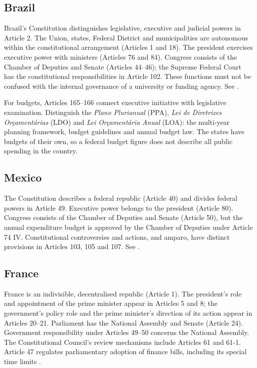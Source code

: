 \subsection{Brazil}
\label{section-gsf-brazil-state}

Brazil's Constitution distinguishes
legislative,
executive and judicial powers in Article 2.
The Union, states, Federal District and
municipalities
are autonomous within the constitutional
arrangement
(Articles 1 and 18).
The president exercises executive power with
ministers
(Articles 76 and 84).
Congress consists of the Chamber of Deputies
and Senate
(Articles 44--46); the Supreme Federal Court
has the
constitutional responsibilities in Article
102.
These functions must not be confused with the
internal
governance of a university or funding agency.
See \cite{gsf-br-constitution}.

For budgets, Articles 165--166 connect
executive
initiative with legislative examination.
Distinguish the \emph{Plano Plurianual}
(PPA),
\emph{Lei de Diretrizes Orçamentárias} (LDO)
and \emph{Lei Orçamentária Anual} (LOA):
the multi-year planning framework, budget
guidelines
and annual budget law.
The states have budgets of their own, so a
federal budget figure does not describe all
public spending in the country.

\subsection{Mexico}
\label{section-gsf-mexico}

The Constitution describes a federal republic
(Article 40) and divides federal powers in
Article 49.
Executive power belongs to the president
(Article 80).
Congress consists of the Chamber of Deputies
and Senate
(Article 50), but the annual expenditure
budget is
approved by the Chamber of Deputies under
Article 74 IV.
Constitutional controversies and actions, and
amparo,
have distinct provisions in Articles 103, 105
and 107.
See \cite{gsf-mx-constitution}.

\subsection{France}
\label{section-gsf-france}

France is an indivisible, decentralised
republic
(Article 1). The president's role and
appointment
of the prime minister appear in Articles 5
and 8;
the government's policy role and the prime
minister's
direction of its action appear in Articles
20--21.
Parliament has the National Assembly and
Senate
(Article 24). Government responsibility under
Articles 49--50 concerns the National
Assembly.
The Constitutional Council's review
mechanisms include
Articles 61 and 61-1.
Article 47 regulates parliamentary adoption
of
finance bills, including its special time
limits
\cite{gsf-fr-constitution}.

